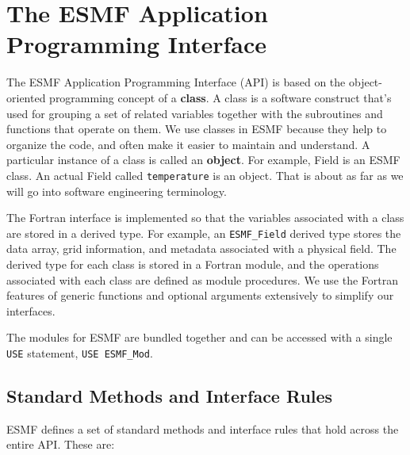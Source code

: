 %

\section{The ESMF Application Programming Interface}

The ESMF Application Programming Interface (API) is based on the
object-oriented programming concept of a {\bf class}.  A class is a 
software construct that's used for grouping a set of related variables 
together with the subroutines and functions that operate on them.  We 
use classes in ESMF because they help to organize the code, and often 
make it easier to maintain and understand.  A particular instance
of a class is called an {\bf object}.  For example, Field is an 
ESMF class.  An actual Field called {\tt temperature} is an object. 
That is about as far as we will go into software engineering
terminology.  

The Fortran interface is implemented so that the variables associated
with a class are stored in a derived type.  For example, an 
{\tt ESMF\_Field} derived type stores the data array, grid 
information, and metadata associated with a physical field.
The derived type for each class is stored in a Fortran module, and 
the operations associated with each class are defined as module
procedures.  We use the Fortran features of generic functions and
optional arguments extensively to simplify our interfaces.

The modules for ESMF are bundled together and can be accessed with a 
single {\tt USE} statement, {\tt USE ESMF\_Mod}.

\subsection{Standard Methods and Interface Rules}

ESMF defines a set of standard methods and interface rules that
hold across the entire API.  These are: 

